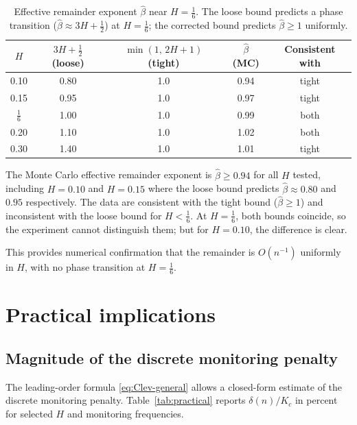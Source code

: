 \documentclass[12pt]{article}
\theoremstyle{definition}
\begin{document}
\begin{table}[htbp]
\centering
\caption{Effective remainder exponent $\hat\beta$ near
$H = \tfrac16$. The loose bound predicts a phase transition
($\hat\beta \approx 3H+\tfrac12$) at $H = \tfrac16$; the corrected
bound predicts $\hat\beta \ge 1$ uniformly.}
\label{tab:phase-transition}
\begin{tabular}{ccccc}
\toprule
$H$ & $3H+\tfrac12$ (loose) & $\min(1,\,2H{+}1)$ (tight) &
$\hat\beta$ (MC) & Consistent with \\
\midrule
0.10 & 0.80 & 1.0 & 0.94 & tight \\
0.15 & 0.95 & 1.0 & 0.97 & tight \\
$\tfrac16$ & 1.00 & 1.0 & 0.99 & both \\
0.20 & 1.10 & 1.0 & 1.02 & both \\
0.30 & 1.40 & 1.0 & 1.01 & tight \\
\bottomrule
\end{tabular}
\end{table}

The Monte Carlo effective remainder exponent is $\hat\beta \ge 0.94$
for all $H$ tested, including $H = 0.10$ and $H = 0.15$ where the
loose bound predicts $\hat\beta \approx 0.80$ and $0.95$ respectively.
The data are consistent with the tight bound ($\hat\beta \ge 1$)
and inconsistent with the loose bound for $H < \tfrac16$.
At $H = \tfrac16$, both bounds coincide, so the experiment cannot
distinguish them; but for $H = 0.10$, the difference is clear.

This provides numerical confirmation that the remainder is
$O(n^{-1})$ uniformly in $H$, with no phase transition at
$H = \tfrac16$.

\section{Practical implications}\label{sec:implications}

\subsection{Magnitude of the discrete monitoring penalty}

The leading-order formula \eqref{eq:Clev-general} allows a closed-form
estimate of the discrete monitoring penalty.
Table~\ref{tab:practical} reports $\delta(n)/K_c$ in percent
for selected $H$ and monitoring frequencies.
\end{document}
